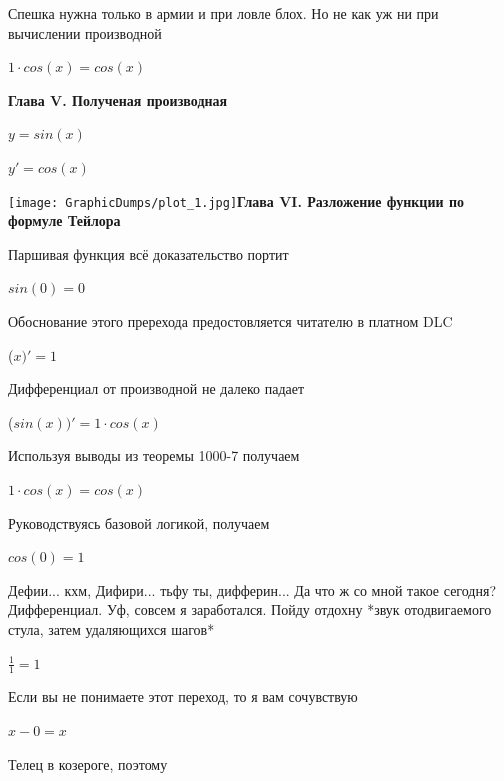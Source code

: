\documentclass[12pt,a4paper,fleqn]{article}
\begin{document}
Спешка нужна только в армии и при ловле блох. Но не как уж ни при вычислении производной\cite{link2}

\begin{center}
$1 \cdot cos(x) = cos(x)$\end{center}
\newpage \textbf{\LARGE{Глава V. Полученая производная}}

$y = $$sin(x)$

$y' = $$cos(x)$

\texttt{[image: GraphicDumps/plot\_1.jpg]}\newpage \textbf{\LARGE{Глава VI. Разложение функции по формуле Тейлора}}

Паршивая функция всё доказательство портит\cite{link2}

\begin{center}
\end{center}
\begin{center}$sin(0) = 0$\end{center}
Обоснование этого пререхода предостовляется читателю в платном DLC

\begin{center}
 ($x)'
  = 1$\end{center}
Дифференциал от производной не далеко падает\cite{link2}

\begin{center}
 ($sin(x))'
  = 1 \cdot cos(x)$\end{center}
Используя выводы из теоремы 1000-7 получаем

\begin{center}
$1 \cdot cos(x) = cos(x)$\end{center}
Руководствуясь базовой логикой, получаем

\begin{center}
\end{center}
\begin{center}$cos(0) = 1$\end{center}
Дефии... кхм, Дифири... тьфу ты, дифферин... Да что ж со мной такое сегодня? Дифференциал. Уф, совсем я заработался. Пойду отдохну *звук отодвигаемого стула, затем удаляющихся шагов*

\begin{center}
\end{center}
\begin{center}$\frac{1}{1} = 1$\end{center}
Если вы не понимаете этот переход, то я вам сочувствую

\begin{center}
$x-0 = x$\end{center}
Телец в козероге, поэтому
\end{document}
